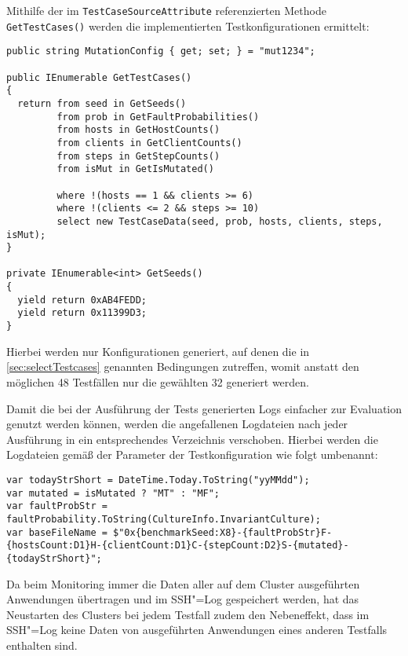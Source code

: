 Mithilfe der im \texttt{TestCaseSourceAttribute} referenzierten Methode \texttt{GetTestCases()} werden die implementierten Testkonfigurationen ermittelt:

\begin{lstlisting}[label=lstgetTestCases:,style=cs,
caption={[Implementierung der Testkonfigurationen]
    Implementierung der Testfälle (gekürzt).
    Die hier nicht gezeigten Methoden zur Rückgabe der implementierten Werte wie \texttt{GetFaultProbabilities()} sind nach dem gleichen Schema aufgebaut wie \texttt{GetSeeds()}.
    Mithilfe der Eigenschaft \texttt{MutationConfig} erfolgt die Auswahl des zu verwendeten Mutationsszenarios.}]
public string MutationConfig { get; set; } = "mut1234";

public IEnumerable GetTestCases()
{
  return from seed in GetSeeds()
         from prob in GetFaultProbabilities()
         from hosts in GetHostCounts()
         from clients in GetClientCounts()
         from steps in GetStepCounts()
         from isMut in GetIsMutated()
         
         where !(hosts == 1 && clients >= 6)
         where !(clients <= 2 && steps >= 10)
         select new TestCaseData(seed, prob, hosts, clients, steps, isMut);
}

private IEnumerable<int> GetSeeds()
{
  yield return 0xAB4FEDD;
  yield return 0x11399D3;
}
\end{lstlisting}

Hierbei werden nur Konfigurationen generiert, auf denen die in \cref{sec:selectTestcases} genannten Bedingungen zutreffen, womit anstatt den möglichen 48 Testfällen nur die gewählten 32 generiert werden.

Damit die bei der Ausführung der Tests generierten Logs einfacher zur Evaluation genutzt werden können, werden die angefallenen Logdateien nach jeder Ausführung in ein entsprechendes Verzeichnis verschoben.
Hierbei werden die Logdateien gemäß der Parameter der Testkonfiguration wie folgt umbenannt:

\begin{lstlisting}[label=lst:moveTestCaseLogs,style=cs,
caption={Bestimmung des Dateinamens zur Umbenennung der Logdateien}]
var todayStrShort = DateTime.Today.ToString("yyMMdd");
var mutated = isMutated ? "MT" : "MF";
var faultProbStr = faultProbability.ToString(CultureInfo.InvariantCulture);
var baseFileName = $"0x{benchmarkSeed:X8}-{faultProbStr}F-{hostsCount:D1}H-{clientCount:D1}C-{stepCount:D2}S-{mutated}-{todayStrShort}";
\end{lstlisting}

Da beim Monitoring immer die Daten aller auf dem Cluster ausgeführten Anwendungen übertragen und im SSH"=Log gespeichert werden, hat das Neustarten des Clusters bei jedem Testfall zudem den Nebeneffekt, dass im SSH"=Log keine Daten von ausgeführten Anwendungen eines anderen Testfalls enthalten sind.
